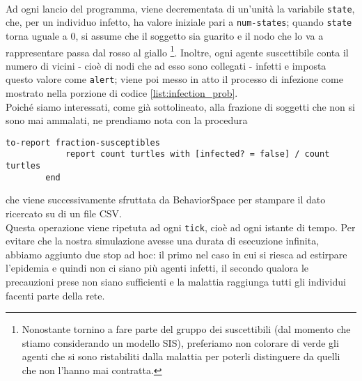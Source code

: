 \\Ad ogni lancio del programma, viene decrementata di un'unità la variabile \texttt{state}, che, per un individuo infetto, ha valore iniziale pari a \texttt{num-states}; quando \texttt{state} torna uguale a $ 0 $, si assume che il soggetto sia guarito e il nodo che lo va a rappresentare passa dal rosso al giallo \footnote{Nonostante tornino a fare parte del gruppo dei suscettibili (dal momento che stiamo considerando un modello SIS), preferiamo non colorare di verde gli agenti che si sono ristabiliti dalla malattia per poterli distinguere da quelli che non l'hanno mai contratta.}. Inoltre, ogni agente suscettibile conta il numero di vicini - cioè di nodi che ad esso sono collegati - infetti e imposta questo valore come \texttt{alert}; viene poi messo in atto il processo di infezione come mostrato nella porzione di codice \ref{list:infection_prob}. \\Poiché siamo interessati, come già sottolineato, alla frazione di soggetti che non si sono mai ammalati, ne prendiamo nota con la procedura 
\begin{center}
	\begin{lstlisting}[autogobble,language={NetLogo},caption={Metodo che riporta la frazione di suscettibili che non hanno mai contratto l'infezione.},label={list:count_susceptibles}]
		to-report fraction-susceptibles
  			report count turtles with [infected? = false] / count turtles
		end	
	\end{lstlisting}
\end{center}
che viene successivamente sfruttata da BehaviorSpace per stampare il dato ricercato su di un file CSV. \\ Questa operazione viene ripetuta ad ogni \texttt{tick}, cioè ad ogni istante di tempo. Per evitare che la nostra simulazione avesse una durata di esecuzione infinita, abbiamo aggiunto due stop ad hoc: il primo nel caso in cui si riesca ad estirpare l'epidemia e quindi non ci siano più agenti infetti, il secondo qualora le precauzioni prese non siano sufficienti e la malattia raggiunga tutti gli individui facenti parte della rete.
